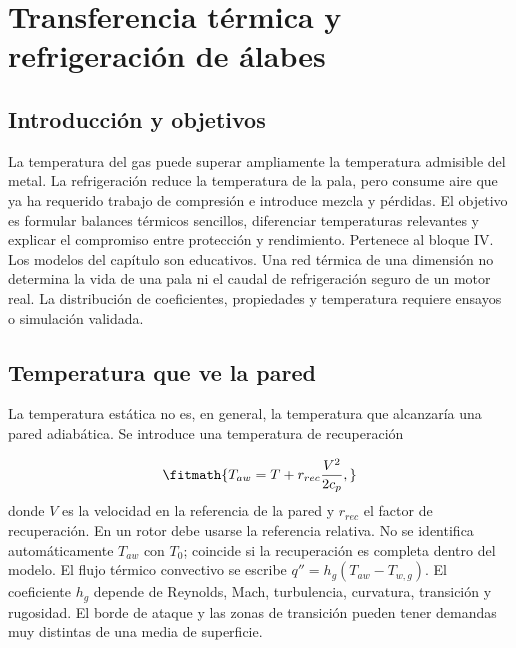\documentclass[10pt,openany]{book}
\begin{document}
\studiumchaptercheck

\chapter{Transferencia térmica y refrigeración de álabes}
\label{chap:c14}


\section{Introducción y objetivos}

La temperatura del gas puede superar ampliamente la temperatura admisible del metal. La refrigeración reduce la temperatura de la pala, pero consume aire que ya ha requerido trabajo de compresión e introduce mezcla y pérdidas. El objetivo es formular balances térmicos sencillos, diferenciar temperaturas relevantes y explicar el compromiso entre protección y rendimiento. Pertenece al bloque IV.
Los modelos del capítulo son educativos. Una red térmica de una dimensión no determina la vida de una pala ni el caudal de refrigeración seguro de un motor real. La distribución de coeficientes, propiedades y temperatura requiere ensayos o simulación validada.

\section{Temperatura que ve la pared}

La temperatura estática no es, en general, la temperatura que alcanzaría una pared adiabática. Se introduce una temperatura de recuperación

\[
\fitmath{T_{aw}=T+r_{rec}\frac{V^2}{2c_p},}
\]
donde \(V\) es la velocidad en la referencia de la pared y \(r_{rec}\) el factor de recuperación. En un rotor debe usarse la referencia relativa. No se identifica automáticamente \(T_{aw}\) con \(T_0\); coincide si la recuperación es completa dentro del modelo.
El flujo térmico convectivo se escribe \(q''=h_g(T_{aw}-T_{w,g})\). El coeficiente \(h_g\) depende de Reynolds, Mach, turbulencia, curvatura, transición y rugosidad. El borde de ataque y las zonas de transición pueden tener demandas muy distintas de una media de superficie.
\end{document}
